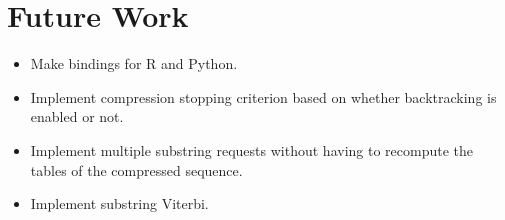 \section{Future Work}

\begin{itemize}
\item Make bindings for R and Python.
\item Implement compression stopping criterion based on whether backtracking is
  enabled or not.
\item Implement multiple substring requests without having to recompute the
  tables of the compressed sequence.
\item Implement substring Viterbi.
\end{itemize}

